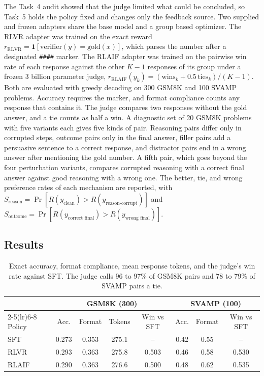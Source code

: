 \documentclass{article}
\begin{document}
The Task~4 audit showed that the judge limited what could be concluded, so
Task~5 holds the policy fixed and changes only the feedback source. Two supplied
and frozen adapters share the base model and a group based optimizer. The RLVR
adapter was trained on the exact reward
$r_{\text{RLVR}}=\mathbf{1}[\text{verifier}(y)=\text{gold}(x)]$, which parses
the number after a designated \texttt{\#\#\#\#} marker. The RLAIF adapter was
trained on the pairwise win rate of each response against the other $K-1$
responses of its group under a frozen 3 billion parameter judge,
$r_{\text{RLAIF}}(y_k)=(\text{wins}_k+0.5\,\text{ties}_k)/(K-1)$. Both are
evaluated with greedy decoding on 300 GSM8K \citep{cobbe2021training} and 100
SVAMP \citep{patel2021nlp} problems. Accuracy
requires the marker, and format compliance counts any response that contains
it. The judge compares two responses without the gold answer, and a tie counts
as half a win. A diagnostic set of 20 GSM8K problems with five variants each gives five kinds of pair. Reasoning pairs differ only in corrupted steps, outcome pairs only in the final answer, filler pairs add a persuasive sentence to a correct response, and distractor pairs end in a wrong answer after mentioning the gold number. A fifth pair, which goes beyond the four perturbation variants, compares
corrupted reasoning with a correct final answer against good reasoning with a
wrong one. The better, tie, and wrong preference rates of each mechanism are
reported, with
$S_{\text{reason}}=\Pr[R(y_{\text{clean}})>R(y_{\text{reason-corrupt}})]$ and
$S_{\text{outcome}}=\Pr[R(y_{\text{correct final}})>R(y_{\text{wrong final}})]$.

\subsection{Results}

\begin{table}[!htb]
  \centering
  \small
  \begin{tabular}{lccccccc}
    \toprule
    & \multicolumn{4}{c}{GSM8K (300)} & \multicolumn{3}{c}{SVAMP (100)} \\
    \cmidrule(lr){2-5}\cmidrule(lr){6-8}
    Policy & Acc. & Format & Tokens & Win vs SFT & Acc. & Format & Win vs SFT \\
    \midrule
    SFT   & 0.273 & 0.353 & 275.1 & --    & 0.42 & 0.55 & --    \\
    RLVR  & 0.293 & 0.363 & 275.8 & 0.503 & 0.46 & 0.58 & 0.530 \\
    RLAIF & 0.290 & 0.363 & 276.6 & 0.500 & 0.48 & 0.62 & 0.535 \\
    \bottomrule
  \end{tabular}
  \vspace{8pt}
  \caption{Exact accuracy, format compliance, mean response tokens, and the
  judge's win rate against SFT. The judge calls 96 to 97\% of GSM8K pairs and
  78 to 79\% of SVAMP pairs a tie.}
  \label{tab:task5}
\end{table}
\end{document}
